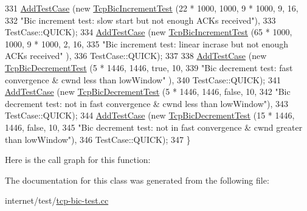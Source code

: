 \begin{DoxyCode}
331     \hyperlink{classns3_1_1TestCase_a3718088e3eefd5d6454569d2e0ddd835}{AddTestCase} (\textcolor{keyword}{new} \hyperlink{classTcpBicIncrementTest}{TcpBicIncrementTest} (22 * 1000, 1000, 9 * 1000, 9, 16,
332                                           \textcolor{stringliteral}{"Bic increment test: slow start but not enough ACKs received"}),
333                  TestCase::QUICK);
334     \hyperlink{classns3_1_1TestCase_a3718088e3eefd5d6454569d2e0ddd835}{AddTestCase} (\textcolor{keyword}{new} \hyperlink{classTcpBicIncrementTest}{TcpBicIncrementTest} (65 * 1000, 1000, 9 * 1000, 2, 16,
335                                           \textcolor{stringliteral}{"Bic increment test: linear incrase but not enough ACKs received"}
      ),
336                  TestCase::QUICK);
337 
338     \hyperlink{classns3_1_1TestCase_a3718088e3eefd5d6454569d2e0ddd835}{AddTestCase} (\textcolor{keyword}{new} \hyperlink{classTcpBicDecrementTest}{TcpBicDecrementTest} (5 * 1446, 1446, \textcolor{keyword}{true}, 10,
339                                           \textcolor{stringliteral}{"Bic decrement test: fast convergence & cwnd less than lowWindow"}
      ),
340                  TestCase::QUICK);
341     \hyperlink{classns3_1_1TestCase_a3718088e3eefd5d6454569d2e0ddd835}{AddTestCase} (\textcolor{keyword}{new} \hyperlink{classTcpBicDecrementTest}{TcpBicDecrementTest} (5 * 1446, 1446, \textcolor{keyword}{false}, 10,
342                                           \textcolor{stringliteral}{"Bic decrement test: not in fast convergence & cwnd less than
       lowWindow"}),
343                  TestCase::QUICK);
344     \hyperlink{classns3_1_1TestCase_a3718088e3eefd5d6454569d2e0ddd835}{AddTestCase} (\textcolor{keyword}{new} \hyperlink{classTcpBicDecrementTest}{TcpBicDecrementTest} (15 * 1446, 1446, \textcolor{keyword}{false}, 10,
345                                           \textcolor{stringliteral}{"Bic decrement test: not in fast convergence & cwnd greater than
       lowWindow"}),
346                  TestCase::QUICK);
347   \}
\end{DoxyCode}


Here is the call graph for this function\+:




The documentation for this class was generated from the following file\+:\begin{DoxyCompactItemize}
\item 
internet/test/\hyperlink{tcp-bic-test_8cc}{tcp-\/bic-\/test.\+cc}\end{DoxyCompactItemize}
